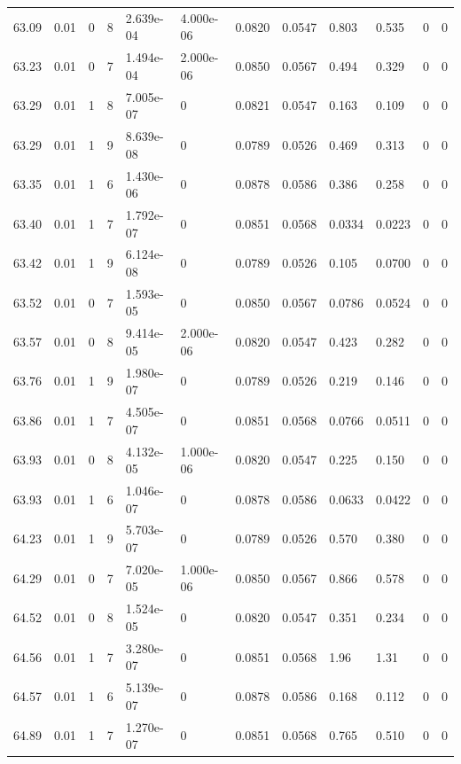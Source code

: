 \documentclass[preview]{standalone}
\begin{document}
{{{{{{{{{{{{{{{{{\begin{tabular}{L{1.2cm}C{1.2cm} C{0.3cm}C{0.5cm} C{1.4cm}C{1.4cm} C{1.4cm}C{1.4cm} C{1.6cm}C{1.6cm} C{1.6cm}C{1.6cm}}
  63.09  &  0.01  & 0     &  8 &  2.639e-04  & 4.000e-06  &  0.0820&   0.0547& 0.803 & 0.535   &  0 & 0  \\ 
  63.23  &  0.01  & 0     &  7 &  1.494e-04  & 2.000e-06  &  0.0850&   0.0567& 0.494 & 0.329   &  0 & 0  \\ 
  63.29  &  0.01  & 1     &  8 &  7.005e-07  & 0  &  0.0821&   0.0547& 0.163 & 0.109   &  0 & 0  \\ 
  63.29  &  0.01  & 1     &  9 &  8.639e-08  & 0  &  0.0789&   0.0526& 0.469 & 0.313   &  0 & 0  \\ 
  63.35  &  0.01  & 1     &  6 &  1.430e-06  & 0  &  0.0878&   0.0586& 0.386 & 0.258   &  0 & 0  \\ 
  63.40  &  0.01  & 1     &  7 &  1.792e-07  & 0  &  0.0851&   0.0568& 0.0334 & 0.0223   &  0 & 0  \\ 
  63.42  &  0.01  & 1     &  9 &  6.124e-08  & 0  &  0.0789&   0.0526& 0.105 & 0.0700   &  0 & 0  \\ 
  63.52  &  0.01  & 0     &  7 &  1.593e-05  & 0  &  0.0850&   0.0567& 0.0786 & 0.0524   &  0 & 0  \\ 
  63.57  &  0.01  & 0     &  8 &  9.414e-05  & 2.000e-06  &  0.0820&   0.0547& 0.423 & 0.282   &  0 & 0  \\ 
  63.76  &  0.01  & 1     &  9 &  1.980e-07  & 0  &  0.0789&   0.0526& 0.219 & 0.146   &  0 & 0  \\ 
  63.86  &  0.01  & 1     &  7 &  4.505e-07  & 0  &  0.0851&   0.0568& 0.0766 & 0.0511   &  0 & 0  \\ 
  63.93  &  0.01  & 0     &  8 &  4.132e-05  & 1.000e-06  &  0.0820&   0.0547& 0.225 & 0.150   &  0 & 0  \\ 
  63.93  &  0.01  & 1     &  6 &  1.046e-07  & 0  &  0.0878&   0.0586& 0.0633 & 0.0422   &  0 & 0  \\ 
  64.23  &  0.01  & 1     &  9 &  5.703e-07  & 0  &  0.0789&   0.0526& 0.570 & 0.380   &  0 & 0  \\ 
  64.29  &  0.01  & 0     &  7 &  7.020e-05  & 1.000e-06  &  0.0850&   0.0567& 0.866 & 0.578   &  0 & 0  \\ 
  64.52  &  0.01  & 0     &  8 &  1.524e-05  & 0  &  0.0820&   0.0547& 0.351 & 0.234   &  0 & 0  \\ 
  64.56  &  0.01  & 1     &  7 &  3.280e-07  & 0  &  0.0851&   0.0568& 1.96 & 1.31   &  0 & 0  \\ 
  64.57  &  0.01  & 1     &  6 &  5.139e-07  & 0  &  0.0878&   0.0586& 0.168 & 0.112   &  0 & 0  \\ 
  64.89  &  0.01  & 1     &  7 &  1.270e-07  & 0  &  0.0851&   0.0568& 0.765 & 0.510   &  0 & 0  \\ 

\end{tabular}}}}}}}}}}}}}}}}}}
\end{document}
